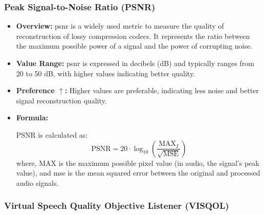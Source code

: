 \documentclass{ioereport}
\begin{document}
\subsubsection{Peak Signal-to-Noise Ratio (PSNR)}
\begin{itemize}
    \item \textbf{Overview:} \gls{psnr} is a widely used metric to measure the quality of reconstruction of lossy compression codecs. It represents the ratio between the maximum possible power of a signal and the power of corrupting noise.
    
    \item \textbf{Value Range:} \gls{psnr} is expressed in decibels (dB) and typically ranges from 20 to 50 dB, with higher values indicating better quality.
    
    \item \textbf{Preference $\uparrow$:} Higher values are preferable, indicating less noise and better signal reconstruction quality.
    
    \item \textbf{Formula:}
    
    PSNR is calculated as:
    \begin{equation}
        \text{PSNR} = 20 \cdot \log_{10}\left(\frac{{\text{MAX}_I}}{\sqrt{\text{MSE}}}\right)
    \end{equation}
    where, \( \text{MAX} \) is the maximum possible pixel value (in audio, the signal's peak value), and \gls{mse} is the mean squared error between the original and processed audio signals.
\end{itemize}

\subsubsection{Virtual Speech Quality Objective Listener (VISQOL)}
\end{document}
